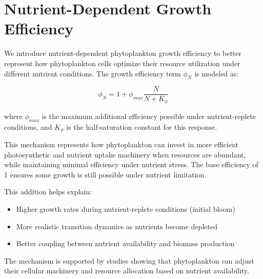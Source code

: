 \section{Nutrient-Dependent Growth Efficiency}

We introduce nutrient-dependent phytoplankton growth efficiency to better represent how phytoplankton cells optimize their resource utilization under different nutrient conditions. The growth efficiency term $\phi_N$ is modeled as:

\[\phi_N = 1 + \phi_{max} \frac{N}{N + K_\phi}\]

where $\phi_{max}$ is the maximum additional efficiency possible under nutrient-replete conditions, and $K_\phi$ is the half-saturation constant for this response.

This mechanism represents how phytoplankton can invest in more efficient photosynthetic and nutrient uptake machinery when resources are abundant, while maintaining minimal efficiency under nutrient stress. The base efficiency of 1 ensures some growth is still possible under nutrient limitation.

This addition helps explain:
\begin{itemize}
\item Higher growth rates during nutrient-replete conditions (initial bloom)
\item More realistic transition dynamics as nutrients become depleted
\item Better coupling between nutrient availability and biomass production
\end{itemize}

The mechanism is supported by studies showing that phytoplankton can adjust their cellular machinery and resource allocation based on nutrient availability.
